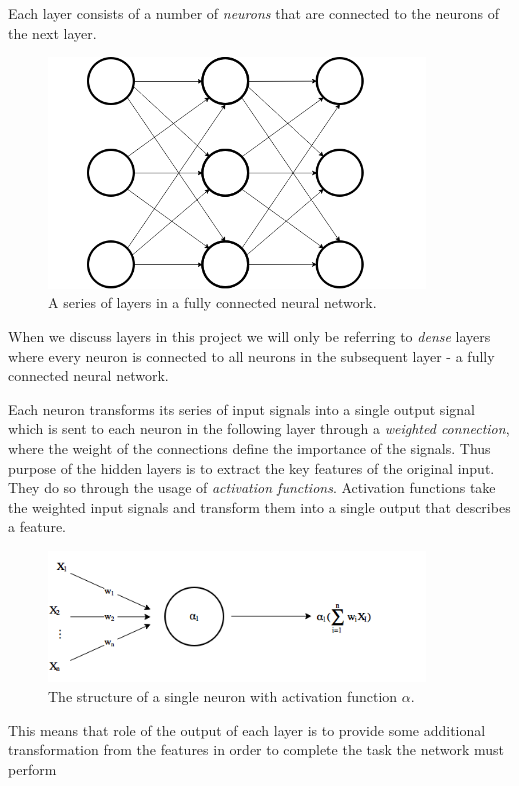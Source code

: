\documentclass[11pt]{article}
\begin{document}
Each layer consists of a number of \textit{neurons} that are connected to the neurons of the
next layer.
\begin{figure}[!h]
    \centering
    \includegraphics[width=10cm]{include/layers.png}
    \caption{A series of layers in a fully connected neural network.}
    \label{fig:layers}
\end{figure}
When we discuss layers in this project we will only be referring to \textit{dense}
layers where every neuron is connected to all neurons in the subsequent layer - a fully
connected neural network.

Each neuron transforms its series of input signals into a single output signal which is sent to
each neuron in the following layer through a \textit{weighted connection}, where
the weight of the connections define the importance of the signals.
Thus purpose of the hidden layers is to extract the key features of the original input.
They do so through the usage of \textit{activation functions}.
Activation functions take the weighted input signals and transform them
into a single output that describes a feature.
\begin{figure}[!h]
    \centering
    \includegraphics[width=10cm]{include/neuron.png}
    \caption{The structure of a single neuron with activation function $\alpha$.}
    \label{fig:neuron}
\end{figure}

This means that role of the output of each layer is to provide some additional
transformation from the features in order to complete the task the network
must perform\cite{DeepLearningBook}
\end{document}
